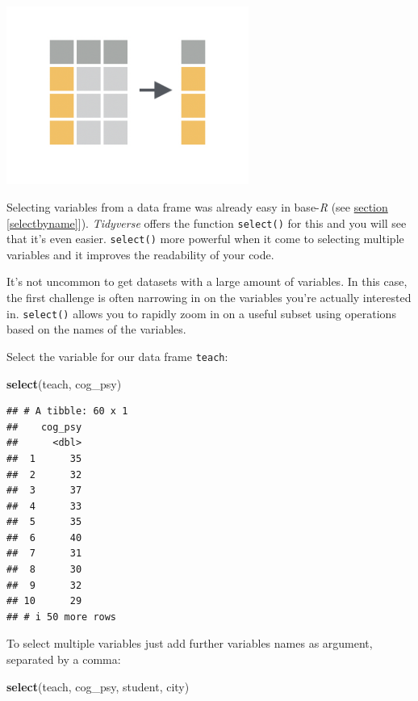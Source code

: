 \documentclass[
]{scrartcl}
\newenvironment{Shaded}{\begin{snugshade}}{\end{snugshade}}
\newcommand{\FunctionTok}[1]{\textcolor[rgb]{0.13,0.29,0.53}{\textbf{#1}}}
\newcommand{\NormalTok}[1]{#1}
\begin{document}
\begin{center}\includegraphics[width=300px]{images/dplyr-select} \end{center}

Selecting variables from a data frame was already easy in base-\emph{R} (see \hyperref[selectbyname]{section} \ref{selectbyname}{]}). \emph{Tidyverse} offers the function \texttt{select()} for this and you will see that it's even easier. \texttt{select()} more powerful when it come to selecting multiple variables and it improves the readability of your code.

It's not uncommon to get datasets with a large amount of variables. In this case, the first challenge is often narrowing in on the variables you're actually interested in. \texttt{select()} allows you to rapidly zoom in on a useful subset using operations based on the names of the variables.

Select the variable for our data frame \texttt{teach}:

\begin{Shaded}
\begin{Highlighting}[]
\FunctionTok{select}\NormalTok{(teach, cog\_psy)}
\end{Highlighting}
\end{Shaded}

\begin{verbatim}
## # A tibble: 60 x 1
##    cog_psy
##      <dbl>
##  1      35
##  2      32
##  3      37
##  4      33
##  5      35
##  6      40
##  7      31
##  8      30
##  9      32
## 10      29
## # i 50 more rows
\end{verbatim}

To select multiple variables just add further variables names as argument, separated by a comma:

\begin{Shaded}
\begin{Highlighting}[]
\FunctionTok{select}\NormalTok{(teach, cog\_psy, student, city)}
\end{Highlighting}
\end{Shaded}
\end{document}
